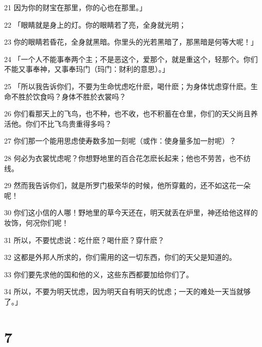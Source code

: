 \par 21 因为你的财宝在那里，你的心也在那里。」
\par 22 「眼睛就是身上的灯。你的眼睛若了亮，全身就光明；
\par 23 你的眼睛若昏花，全身就黑暗。你里头的光若黑暗了，那黑暗是何等大呢！」
\par 24 「一个人不能事奉两个主；不是恶这个，爱那个，就是重这个，轻那个。你们不能又事奉神，又事奉玛门（玛门：财利的意思）。」
\par 25 「所以我告诉你们，不要为生命忧虑吃什麽，喝什麽；为身体忧虑穿什麽。生命不胜於饮食吗？身体不胜於衣裳吗？
\par 26 你们看那天上的飞鸟，也不种，也不收，也不积蓄在仓里，你们的天父尚且养活他。你们不比飞鸟贵重得多吗？
\par 27 你们那一个能用思虑使寿数多加一刻呢（或作：使身量多加一肘呢）？
\par 28 何必为衣裳忧虑呢？你想野地里的百合花怎麽长起来；他也不劳苦，也不纺线。
\par 29 然而我告诉你们，就是所罗门极荣华的时候，他所穿戴的，还不如这花一朵呢！
\par 30 你们这小信的人哪！野地里的草今天还在，明天就丢在炉里，神还给他这样的妆饰，何况你们呢！
\par 31 所以，不要忧虑说：吃什麽？喝什麽？穿什麽？
\par 32 这都是外邦人所求的，你们需用的这一切东西，你们的天父是知道的。
\par 33 你们要先求他的国和他的义，这些东西都要加给你们了。
\par 34 所以，不要为明天忧虑，因为明天自有明天的忧虑；一天的难处一天当就够了。」

\chapter{7}

